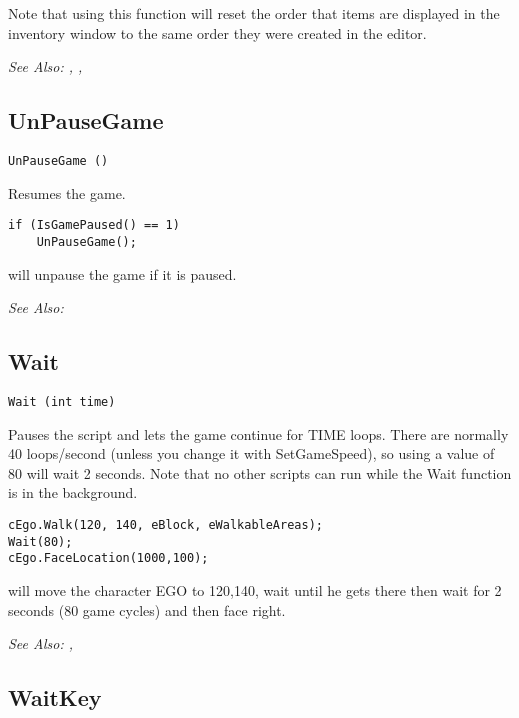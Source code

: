 Note that using this function will reset the order that items are displayed
in the inventory window to the same order they were created in the editor.

\it{See Also:} ,
,


\subsection{UnPauseGame}\label{UnPauseGame}%

\begin{verbatim}
UnPauseGame ()
\end{verbatim}
Resumes the game.

\begin{verbatim}
if (IsGamePaused() == 1)
    UnPauseGame();
\end{verbatim}
will unpause the game if it is paused.

\it{See Also:} 

\subsection{Wait}\label{Wait}%

\begin{verbatim}
Wait (int time)
\end{verbatim}
Pauses the script and lets the game continue for TIME loops. There are
normally 40 loops/second (unless you change it with SetGameSpeed), so using
a value of 80 will wait 2 seconds. Note that no other scripts can
run while the Wait function is in the background.

\begin{verbatim}
cEgo.Walk(120, 140, eBlock, eWalkableAreas);
Wait(80);
cEgo.FaceLocation(1000,100);
\end{verbatim}
will move the character EGO to 120,140, wait until he gets there then wait for 2 seconds (80 game cycles) and then face right.

\it{See Also:} , 

\subsection{WaitKey}\label{WaitKey}%

